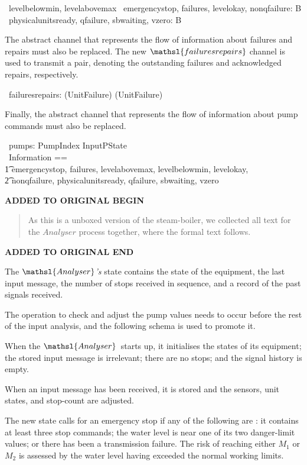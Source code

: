 \documentclass{report}
\newcommand{\boolean}{{\mathbb B}}
\newenvironment{addedstuff}{\begin{flushleft}\textbf{ADDED TO ORIGINAL BEGIN}\begin{quote}\begin{minipage}{.8\textwidth}}{\end{minipage}\end{quote}\textbf{ADDED TO ORIGINAL END}\end{flushleft}}
\begin{document}
\begin{circus}
   \circchannel\ levelbelowmin, levelabovemax %
  \also %
  \circchannel\ emergencystop, failures, levelokay, nonqfailure: \boolean \\
  \circchannel\ physicalunitsready, qfailure, sbwaiting, vzero: \boolean
\end{circus}
The abstract channel that represents the flow of information about
failures and repairs must also be replaced.  The new \(
\mathsl{failuresrepairs} \)\/ channel is used to transmit a pair,
denoting the outstanding failures and acknowledged repairs,
respectively.
\begin{circus}
   \circchannel\ failuresrepairs: (\power UnitFailure) \cross (\power UnitFailure)
\end{circus}
Finally, the abstract channel that represents the flow of information
about pump commands must also be replaced.
\begin{circus}
  \circchannel\ pumps: PumpIndex \fun InputPState \\
  \circchannelset\ Information ==  \\ \t1
    \lchanset emergencystop, failures, levelabovemax, levelbelowmin, levelokay, \\ \t2
              nonqfailure, physicalunitsready, qfailure, sbwaiting, vzero \rchanset
\end{circus}

\begin{addedstuff}
   As this is a unboxed version of the steam-boiler, we collected all text for the
   $Analyser$ process together, where the formal text follows.
\end{addedstuff}

The \( \mathsl{Analyser} \)\textsl{'s}\/ state contains the state of
the equipment, the last input message, the number of stops received in
sequence, and a record of the past signals received.

The operation to check and adjust the pump values needs to occur
before the rest of the input analysis, and the following schema is
used to promote it.

When the \( \mathsl{Analyser} \, \)\/ starts up, it initialises the
states of its equipment; the stored input message is irrelevant; there
are no stops; and the signal history is empty.

When an input message has been received, it is stored and the sensors,
unit states, and stop-count are adjusted.

The new state calls for an emergency stop if any of the following are
\true: it contains at least three stop commands; the water level is
near one of its two danger-limit values; or there has been a
transmission failure.  The risk of reaching either \( M_1 \)\/ or \(
M_2 \)\/ is assessed by the water level having exceeded the normal
working limits.
\end{document}
